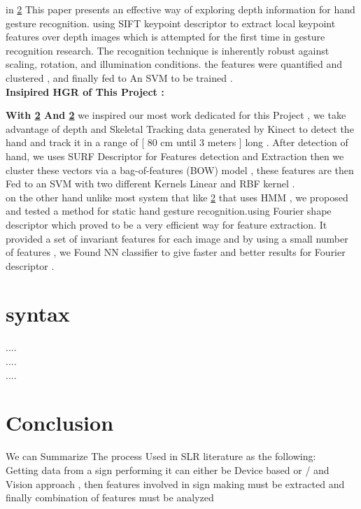 in \ref{} This paper presents an effective way of exploring depth information for hand gesture recognition. using  SIFT keypoint descriptor to extract local keypoint features
over depth images which is attempted for the first time in gesture recognition research. The recognition technique is inherently robust against scaling, rotation, and illumination conditions.  the features were  quantified  and clustered , and finally fed to  An SVM to be trained .\\


\textbf{ Insipired HGR of This Project : }


\textbf{With \ref{} And \ref{} } we inspired our most work dedicated for this Project , we take advantage of  depth and Skeletal Tracking  data generated by Kinect to detect the hand and track it  in a range of [ 80 cm until 3 meters ] long  .
After detection of hand, we uses SURF Descriptor for Features detection and Extraction then we  cluster these vectors via a bag-of-features (BOW) model , these features are then Fed to an SVM with two different Kernels Linear and RBF kernel .\\

on the other hand unlike most system that like \ref{} that uses HMM ,  we proposed and tested a method for static hand gesture recognition.using  Fourier shape  descriptor which proved to be a very efficient way for feature extraction. It provided a set of invariant features for each image and by using a small number of features , we Found NN classifier to give faster and better results for Fourier descriptor .


\section{syntax}

....
\\
....
\\
....



\section{Conclusion}

We can Summarize The process Used in SLR literature as the following:\\

Getting data from a sign performing  it can either be Device based or / and Vision approach , then features
involved in sign making must be extracted and finally combination of features must be analyzed 

